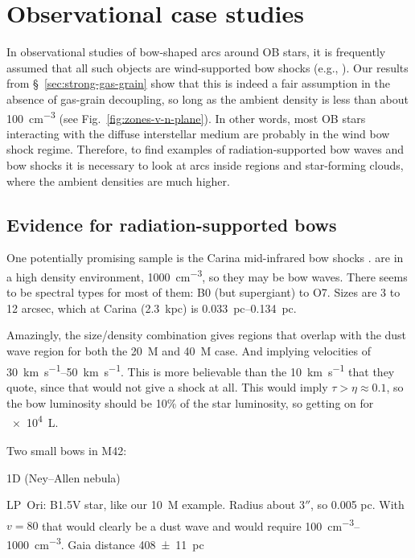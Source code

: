 \section{Observational case studies}
\label{sec:case-studies}

In observational studies of bow-shaped arcs around OB stars, it is
frequently assumed that all such objects are wind-supported bow shocks
(e.g., \citealp{Kobulnicky:2016a}). Our results from
\S~\ref{sec:strong-gas-grain} show that this is indeed a fair
assumption in the absence of gas-grain decoupling, so long as the
ambient density is less than about \SI{100}{cm^{-3}} (see
Fig.~\ref{fig:zones-v-n-plane}). In other words, most OB stars
interacting with the diffuse interstellar medium are probably in the
wind bow shock regime.  Therefore, to find examples of
radiation-supported bow waves and bow shocks it is necessary to look
at arcs inside \hii{} regions and star-forming clouds, where the
ambient densities are much higher.

\subsection{Evidence for radiation-supported bows}

One potentially promising sample is the Carina mid-infrared bow shocks
\citep{Sexton:2015b}.   are in a high density environment,
\SI{1000}{cm^{-3}}, so they may be bow waves.  There seems to be
spectral types for most of them: B0 (but supergiant) to O7.  Sizes are
3 to 12 arcsec, which at Carina (\SI{2.3}{kpc}) is
\SIrange{0.033}{0.134}{pc}.

Amazingly, the size/density combination gives regions that overlap
with the dust wave region for both the \SI{20}{M_\odot} and \SI{40}{M_\odot}
case.  And implying velocities of \SIrange{30}{50}{km.s^{-1}}.  This
is more believable than the \SI{10}{km.s^{-1}} that they quote, since
that would not give a shock at all.  This would imply
\(\tau > \eta \approx 0.1\), so the bow luminosity should be 10\% of the star
luminosity, so getting on for \SI{e4}{L_\odot}.

Two small bows in M42:

\newcommand{\thD}{\(\theta^1\)\,Ori~D}
\th1D{} (Ney--Allen nebula) \citep{Robberto:2005a}

LP~Ori: B1.5V star, like our \SI{10}{M_\odot} example. Radius about
\(3''\), so 0.005 pc.  With \(v = 80\) that would clearly be a dust
wave and would require \SIrange{100}{1000}{cm^{-3}}. Gaia distance \SI{408 +- 11}{pc}


